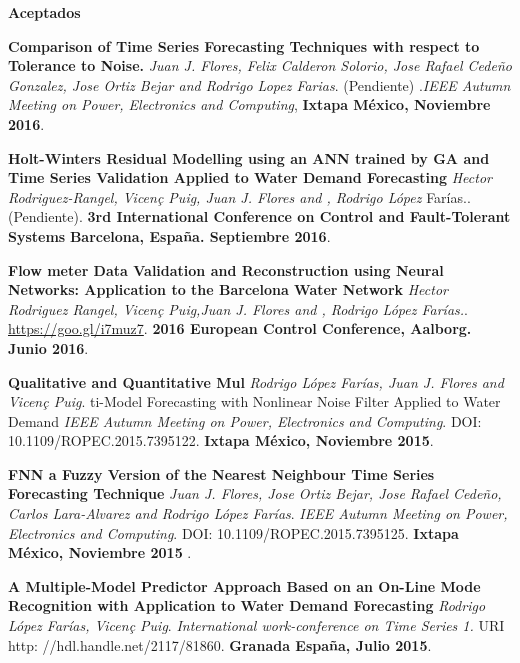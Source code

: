 \documentclass[10pt]{article}
\newenvironment{innerlist}[1][\enskip\textbullet]%
        {\begin{compactitem}[#1]}{\end{compactitem}}
\newcommand{\blankline}{\quad\pagebreak[2]}
\begin{document}
\blankline
\textbf{Aceptados}
\begin{innerlist}


\item \textbf{Comparison of Time Series Forecasting Techniques with respect to Tolerance to Noise.} \textit{Juan J. Flores, Felix Calderon Solorio, Jose Rafael Cede\~no Gonzalez, Jose Ortiz Bejar and Rodrigo Lopez Farias}. (Pendiente) .\textit{IEEE Autumn Meeting on Power, Electronics and Computing}, \textbf{Ixtapa México, Noviembre 2016}.


\item \textbf{Holt-Winters Residual Modelling using an ANN trained by GA and Time Series Validation Applied to Water Demand Forecasting} \textit{Hector Rodriguez-Rangel, Vicen\c{c} Puig, Juan J. Flores and ,  Rodrigo López} Farías.. (Pendiente). \textbf{3rd International Conference on Control and Fault-Tolerant Systems} \textbf{Barcelona, España. Septiembre 2016}.

\item \textbf{Flow meter Data Validation and Reconstruction using Neural Networks: Application to the Barcelona Water Network} \textit{Hector Rodriguez Rangel, Vicen\c{c} Puig,Juan J. Flores and ,  Rodrigo López Farías.}. \url{https://goo.gl/i7muz7}. \textbf{2016 European Control Conference, Aalborg. Junio 2016}.

\item \textbf{Qualitative and Quantitative Mul} \textit{Rodrigo López Farías, Juan J. Flores and Vicen\c{c} Puig}.  ti-Model Forecasting with Nonlinear Noise Filter Applied to Water Demand \textit{IEEE Autumn Meeting on Power, Electronics and Computing}. DOI: 10.1109/ROPEC.2015.7395122.  \textbf{Ixtapa México, Noviembre 2015}.

\item \textbf{FNN a Fuzzy Version of the Nearest Neighbour Time Series Forecasting Technique } \textit{Juan J. Flores, Jose Ortiz Bejar, Jose Rafael Cedeño, Carlos Lara-Alvarez and Rodrigo López Farías}. \textit{IEEE Autumn Meeting on Power, Electronics and Computing}. DOI: 10.1109/ROPEC.2015.7395125. \textbf{Ixtapa México, Noviembre 2015 }.

\item \textbf{A Multiple-Model Predictor Approach Based on an On-Line Mode Recognition with Application to Water Demand Forecasting} \textit{Rodrigo López Farías, Vicen\c{c} Puig}.  \textit{International work-conference on Time Series 1. 
} URI http: //hdl.handle.net/2117/81860. \textbf{Granada España, Julio 2015}.


\end{innerlist}
\end{document}
